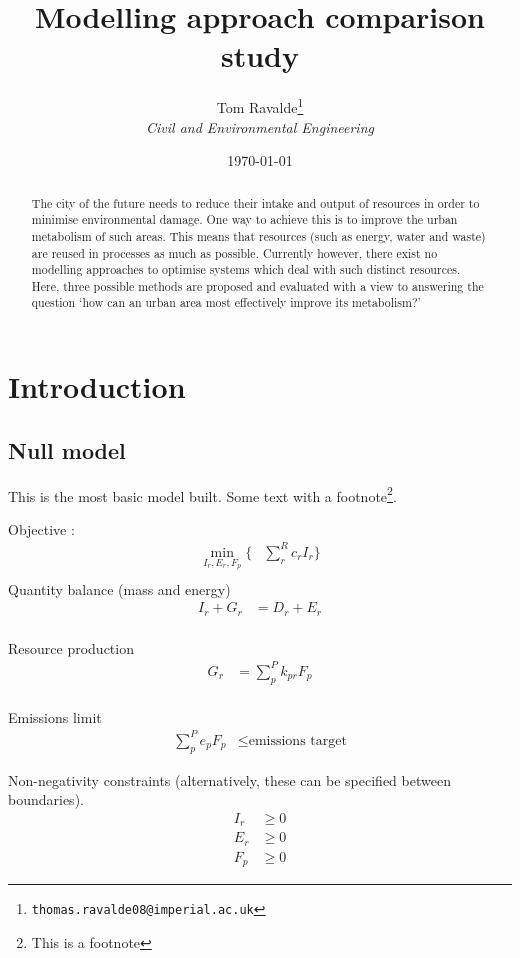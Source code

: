 \documentclass[a4paper]{article}\usepackage{graphicx, color}
\title{Modelling approach comparison study}
\author{Tom Ravalde\footnote{\texttt{thomas.ravalde08@imperial.ac.uk}} \\[0.3em]
\emph{Civil and Environmental Engineering}}
\date{\today}
\begin{document}
\maketitle
\thispagestyle{empty}

\bigskip \bigskip
\begin{abstract}
	The city of the future needs to reduce their intake and output of resources in order to minimise environmental damage. One way to achieve this is to improve the urban metabolism of such areas. This means that resources (such as energy, water and waste) are reused in processes as much as possible. Currently however, there exist no modelling approaches to optimise systems which deal with such distinct resources. Here, three possible methods are proposed and evaluated with a view to answering the question `how can an urban area most effectively improve its metabolism?'
\end{abstract}

\section{Introduction}

\subsection{Null model}
This is the most basic model built. Some text with a footnote\footnote{This is a footnote}.

Objective :
\begin{align}
\min_{I_r,E_r,F_p} \Bigg\{&\sum_{r}^R c_rI_{r} \Bigg\} \\
\end{align}
Quantity balance (mass and energy)
\begin{align}
I_r+G_r &= D_r + E_r \\
\end{align}

Resource production
\begin{align}
G_r&=\sum_{p}^{P}k_{pr} F_p \\
\end{align}

Emissions limit
\begin{align}
\sum_{p}^P e_p F_p &\leq \mbox{emissions target} 
\end{align}

Non-negativity constraints (alternatively, these can be specified between boundaries).
\begin{align}
I_r &\geq 0 \label{eq:tat_basic_imports} \\
E_r &\geq 0 \\
F_p &\geq 0 
\end{align}
\end{document}
